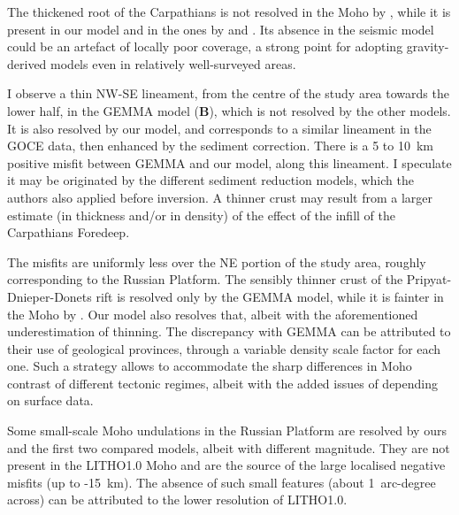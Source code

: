 The thickened root of the Carpathians is not resolved in the Moho by \textcite{Grad2009}, while it is present in our model and in the ones by \textcite{Reguzzoni2015} and \textcite{Pasyanos2014}.
Its absence in the seismic model could be an artefact of locally poor coverage, a strong point for adopting gravity-derived models even in relatively well-surveyed areas.

I observe a thin NW-SE lineament, from the centre of the study area towards the lower half, in the GEMMA model (\textbf{B}), which is not resolved by the other models.
It is also resolved by our model, and corresponds to a similar lineament in the GOCE data, then enhanced by the sediment correction.
There is a 5 to 10~\si{\kilo \metre} positive misfit between GEMMA and our model, along this lineament.
I speculate it may be originated by the different sediment reduction models, which the authors also applied before inversion.
A thinner crust may result from a larger estimate (in thickness and/or in density) of the effect of the infill of the Carpathians Foredeep.

The misfits are uniformly less over the NE portion of the study area, roughly corresponding to the Russian Platform.
The sensibly thinner crust of the Pripyat-Dnieper-Donets rift is resolved only by the GEMMA model, while it is fainter in the Moho by \textcite{Grad2009}.
Our model also resolves that, albeit with the aforementioned underestimation of thinning.
The discrepancy with GEMMA can be attributed to their use of geological provinces, through a variable density scale factor for each one. Such a strategy allows to accommodate the sharp differences in Moho contrast of different tectonic regimes, albeit with the added issues of depending on surface data.

Some small-scale Moho undulations in the Russian Platform are resolved by ours and the first two compared models, albeit with different magnitude.
They are not present in the LITHO1.0 Moho and are the source of the large localised negative misfits (up to -15~\si{\kilo \metre}).
The absence of such small features (about 1~arc-degree across) can be attributed to the lower resolution of LITHO1.0.

